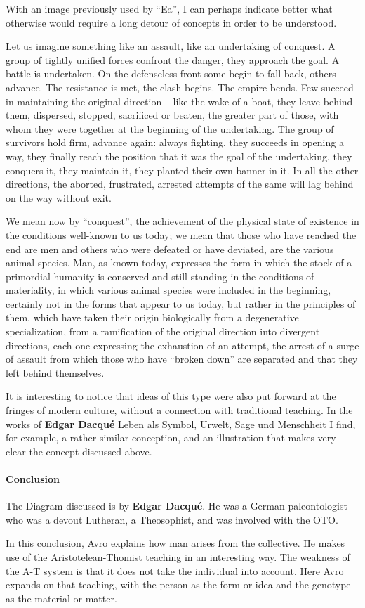 With an image previously used by ``Ea'', I can perhaps indicate better what otherwise would require a long detour of concepts in order to be understood.

Let us imagine something like an assault, like an undertaking of conquest. A group of tightly unified forces confront the danger, they approach the goal. A battle is undertaken. On the defenseless front some begin to fall back, others advance. The resistance is met, the clash begins. The empire bends. Few succeed in maintaining the original direction -- like the wake of a boat, they leave behind them, dispersed, stopped, sacrificed or beaten, the greater part of those, with whom they were together at the beginning of the undertaking. The group of survivors hold firm, advance again: always fighting, they succeeds in opening a way, they finally reach the position that it was the goal of the undertaking, they conquers it, they maintain it, they planted their own banner in it. In all the other directions, the aborted, frustrated, arrested attempts of the same will lag behind on the way without exit.

We mean now by ``conquest'', the achievement of the physical state of existence in the conditions well-known to us today; we mean that those who have reached the end are men and others who were defeated or have deviated, are the various animal species. Man, as known today, expresses the form in which the stock of a primordial humanity is conserved and still standing in the conditions of materiality, in which various animal species were included in the beginning, certainly not in the forms that appear to us today, but rather in the principles of them, which have taken their origin biologically from a degenerative specialization, from a ramification of the original direction into divergent directions, each one expressing the exhaustion of an attempt, the arrest of a surge of assault from which those who have ``broken down'' are separated and that they left behind themselves.

It is interesting to notice that ideas of this type were also put forward at the fringes of modern culture, without a connection with traditional teaching. In the works of \textbf{Edgar Dacqué} Leben als Symbol, Urwelt, Sage und Menschheit I find, for example, a rather similar conception, and an illustration that makes very clear the concept discussed above.

\paragraph{Conclusion}
\begin{quotex}
The Diagram discussed is by \textbf{Edgar Dacqué}. He was a German paleontologist who was a devout Lutheran, a Theosophist, and was involved with the OTO.

In this conclusion, Avro explains how man arises from the collective. He makes use of the Aristotelean-Thomist teaching in an interesting way. The weakness of the A-T system is that it does not take the individual into account. Here Avro expands on that teaching, with the person as the form or idea and the genotype as the material or matter.
\end{quotex}


